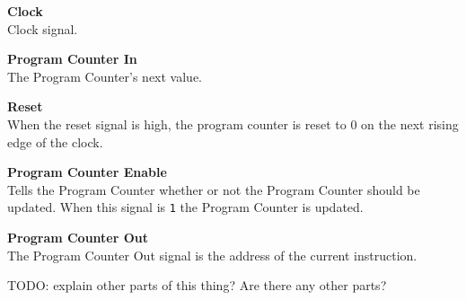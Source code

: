 \begin{description}
\item{\textbf{Clock}} \\

Clock signal.

\item{\textbf{Program Counter In}} \\

The Program Counter's next value.

\item{\textbf{Reset}} \\

When the reset signal is high, the program counter is reset to 0 on the next rising edge of the clock.

\item{\textbf{Program Counter Enable}} \\

Tells the Program Counter whether or not the Program Counter should be updated.
When this signal is \texttt{1} the Program Counter is updated.

\end{description}


\begin{description}
\item{\textbf{Program Counter Out}} \\

The Program Counter Out signal is the address of the current instruction.

\end{description}

TODO: explain other parts of this thing? Are there any other parts?
